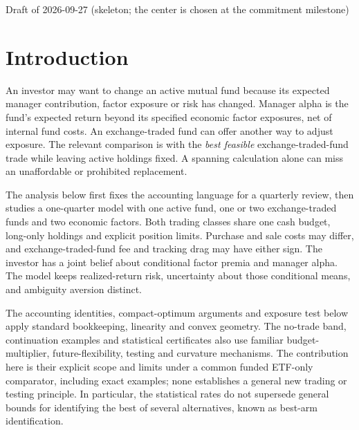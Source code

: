 \documentclass[11pt]{article}
\begin{document}
Draft of 2026-09-27 (skeleton; the center is chosen at the commitment milestone)

\section{Introduction}\label{sec:1}

An investor may want to change an active mutual fund because its
expected manager contribution, factor exposure or risk has changed.
Manager alpha is the fund's expected return beyond its specified
economic factor exposures, net of internal fund costs.
An exchange-traded fund can offer another way to adjust exposure.
The relevant comparison is with the \emph{best feasible} exchange-traded-fund
trade while leaving active holdings fixed. A spanning calculation
alone can miss an unaffordable or prohibited replacement.

The analysis below first fixes the accounting language for a
quarterly review, then studies a one-quarter model with one active
fund, one or two exchange-traded funds and two economic factors.
Both trading classes share one cash budget, long-only holdings and
explicit position limits. Purchase and sale costs may differ, and
exchange-traded-fund fee and tracking drag may have either sign.
The investor has a joint belief about conditional factor premia and
manager alpha. The model keeps realized-return risk, uncertainty
about those conditional means, and ambiguity aversion distinct.

The accounting identities, compact-optimum arguments and exposure
test below apply standard bookkeeping, linearity and convex geometry.
The no-trade band, continuation examples and statistical certificates
also use familiar budget-multiplier, future-flexibility, testing and
curvature mechanisms. The contribution here is their explicit scope and
limits
under a common funded ETF-only comparator, including exact examples;
none establishes a general new trading or testing principle. In
particular, the statistical rates do not supersede general
bounds for identifying the best of several alternatives, known as
best-arm identification.
\end{document}
